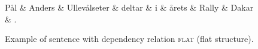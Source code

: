 \documentclass[a4paper,12pt,english]{book}
\begin{document}
\begin{figure}
    \begin{dependency}[theme = simple]
        \begin{deptext}[column sep=1em]
            Pål \& Anders \& Ullevålseter \& deltar \& i \& årets \& Rally \&
            Dakar \& . \\
        \end{deptext}
    \end{dependency}
    \caption{Example of sentence with dependency relation \textsc{flat}
        (flat structure).}
    \label{exflat}
\end{figure}

\end{document}
